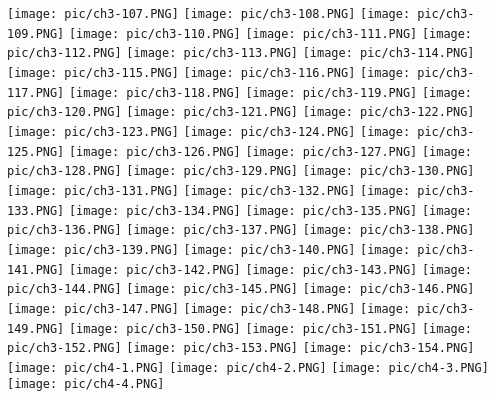 \documentclass[UTF-8]{ctexart}
\begin{document}
\begin{center}
    \texttt{[image: pic/ch3-107.PNG]}
    \texttt{[image: pic/ch3-108.PNG]}
    \texttt{[image: pic/ch3-109.PNG]}
    \texttt{[image: pic/ch3-110.PNG]}
    \texttt{[image: pic/ch3-111.PNG]}
    \texttt{[image: pic/ch3-112.PNG]}
    \texttt{[image: pic/ch3-113.PNG]}
    \texttt{[image: pic/ch3-114.PNG]}
    \texttt{[image: pic/ch3-115.PNG]}
    \texttt{[image: pic/ch3-116.PNG]}
    \texttt{[image: pic/ch3-117.PNG]}
    \texttt{[image: pic/ch3-118.PNG]}
    \texttt{[image: pic/ch3-119.PNG]}
    \texttt{[image: pic/ch3-120.PNG]}
    \texttt{[image: pic/ch3-121.PNG]}
    \texttt{[image: pic/ch3-122.PNG]}
    \texttt{[image: pic/ch3-123.PNG]}
    \texttt{[image: pic/ch3-124.PNG]}
    \texttt{[image: pic/ch3-125.PNG]}
    \texttt{[image: pic/ch3-126.PNG]}
    \texttt{[image: pic/ch3-127.PNG]}
    \texttt{[image: pic/ch3-128.PNG]}
    \texttt{[image: pic/ch3-129.PNG]}
    \texttt{[image: pic/ch3-130.PNG]}
    \texttt{[image: pic/ch3-131.PNG]}
    \texttt{[image: pic/ch3-132.PNG]}
    \texttt{[image: pic/ch3-133.PNG]}
    \texttt{[image: pic/ch3-134.PNG]}
    \texttt{[image: pic/ch3-135.PNG]}
    \texttt{[image: pic/ch3-136.PNG]}
    \texttt{[image: pic/ch3-137.PNG]}
    \texttt{[image: pic/ch3-138.PNG]}
    \texttt{[image: pic/ch3-139.PNG]}
    \texttt{[image: pic/ch3-140.PNG]}
    \texttt{[image: pic/ch3-141.PNG]}
    \texttt{[image: pic/ch3-142.PNG]}
    \texttt{[image: pic/ch3-143.PNG]}
    \texttt{[image: pic/ch3-144.PNG]}
    \texttt{[image: pic/ch3-145.PNG]}
    \texttt{[image: pic/ch3-146.PNG]}
    \texttt{[image: pic/ch3-147.PNG]}
    \texttt{[image: pic/ch3-148.PNG]}
    \texttt{[image: pic/ch3-149.PNG]}
    \texttt{[image: pic/ch3-150.PNG]}
    \texttt{[image: pic/ch3-151.PNG]}
    \texttt{[image: pic/ch3-152.PNG]}
    \texttt{[image: pic/ch3-153.PNG]}
    \texttt{[image: pic/ch3-154.PNG]}
    \newpage
    \texttt{[image: pic/ch4-1.PNG]}
    \texttt{[image: pic/ch4-2.PNG]}
    \texttt{[image: pic/ch4-3.PNG]}
    \texttt{[image: pic/ch4-4.PNG]}

\end{center}
\end{document}
